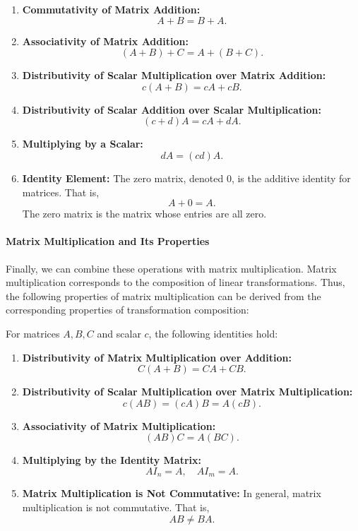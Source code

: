 \documentclass[a4paper,12pt]{article}
\begin{document}
\begin{enumerate}
    \item \textbf{Commutativity of Matrix Addition:} 
    \[
    A + B = B + A.
    \]
    
    \item \textbf{Associativity of Matrix Addition:}
    \[
    (A + B) + C = A + (B + C).
    \]
    
    \item \textbf{Distributivity of Scalar Multiplication over Matrix Addition:}
    \[
    c(A + B) = cA + cB.
    \]
    
    \item \textbf{Distributivity of Scalar Addition over Scalar Multiplication:}
    \[
    (c + d)A = cA + dA.
    \]
    
    \item \textbf{Multiplying by a Scalar:}
    \[
    dA = (cd)A.
    \]
    
    \item \textbf{Identity Element:} The zero matrix, denoted \( 0 \), is the additive identity for matrices. That is,
    \[
    A + 0 = A.
    \]
    The zero matrix is the matrix whose entries are all zero.
\end{enumerate}

\paragraph{Matrix Multiplication and Its Properties}

Finally, we can combine these operations with matrix multiplication. Matrix multiplication corresponds to the composition of linear transformations. Thus, the following properties of matrix multiplication can be derived from the corresponding properties of transformation composition:

For matrices \( A, B, C \) and scalar \( c \), the following identities hold:

\begin{enumerate}
    \item \textbf{Distributivity of Matrix Multiplication over Addition:}
    \[
    C(A + B) = CA + CB.
    \]
    
    \item \textbf{Distributivity of Scalar Multiplication over Matrix Multiplication:}
    \[
    c(AB) = (cA)B = A(cB).
    \]
    
    \item \textbf{Associativity of Matrix Multiplication:} 
    \[
    (AB)C = A(BC).
    \]
    
    \item \textbf{Multiplying by the Identity Matrix:}
    \[
    AI_n = A, \quad A I_m = A.
    \]
    
    \item \textbf{Matrix Multiplication is Not Commutative:} In general, matrix multiplication is not commutative. That is,
    \[
    AB \neq BA.
    \]
\end{enumerate}
\end{document}
